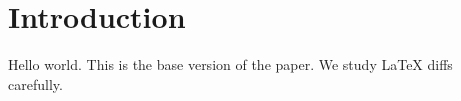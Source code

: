 \section{Introduction}
Hello world. This is the base version of the paper.
We study LaTeX diffs carefully.
